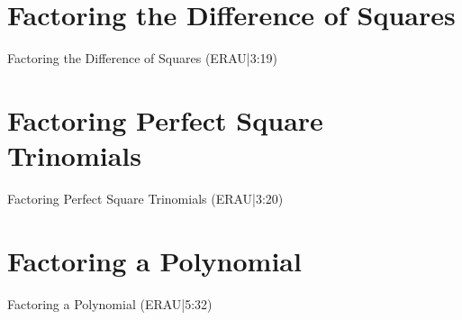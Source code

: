 \documentclass{ximera}
\begin{document}
\section*{Factoring the Difference of Squares}

Factoring the Difference of Squares (ERAU|3:19)




\section*{Factoring Perfect Square Trinomials}

Factoring Perfect Square Trinomials (ERAU|3:20)




\section*{Factoring a Polynomial}

Factoring a Polynomial (ERAU|5:32)

\end{document}
